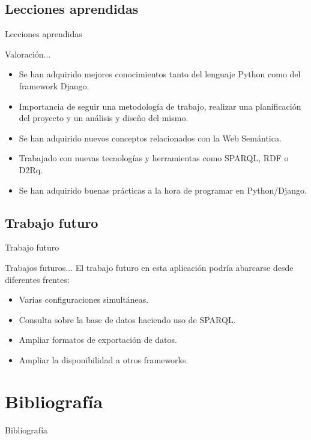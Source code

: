 \documentclass[spanish,xcolor=table,svgnames]{beamer}
\begin{document}
\subsection*{Lecciones aprendidas}
\begin{frame}{Lecciones aprendidas}
\begin{block}{Valoración...}
  \begin{itemize}
    \item Se han adquirido mejores conocimientos tanto del lenguaje Python como
      del framework Django.
    \item Importancia de seguir una metodologí­a de trabajo, realizar una
      planificación del proyecto y un análisis y diseño del mismo.
    \item Se han adquirido nuevos conceptos relacionados con la Web Semántica.
    \item Trabajado con nuevas tecnologí­as y herramientas como SPARQL, RDF o
      D2Rq.
    \item Se han adquirido buenas prácticas a la hora de programar en
      Python/Django.
  \end{itemize}
\end{block}
\end{frame}

\subsection*{Trabajo futuro}
\begin{frame}{Trabajo futuro}
\begin{block}{Trabajos futuros...}
El trabajo futuro en esta aplicación podrí­a abarcarse desde diferentes frentes:
\begin{itemize}
\item Varias configuraciones simultáneas.
\item Consulta sobre la base de datos haciendo uso de SPARQL.
\item Ampliar formatos de exportación de datos.
\item Ampliar la disponibilidad a otros frameworks.
\end{itemize}
\end{block}
\end{frame}

\section{Bibliografí­a}
\begin{frame}{Bibliografí­a}
  \tableofcontents[currentsection]
\end{frame}
\end{document}
